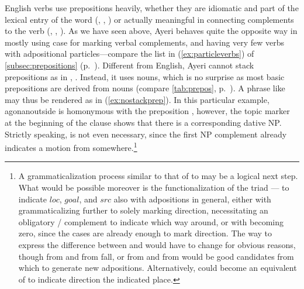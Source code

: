 English verbs use prepositions heavily, whether they are idiomatic and part of
the lexical entry of the word (, , ) or
actually meaningful in connecting complements to the verb (, 
, ). As we have seen above, Ayeri behaves quite the
opposite way in mostly using case for marking verbal complements, and having
very few verbs with adpositional particles---compare the list in
(\ref{ex:particleverbs}) of \autoref{subsec:prepositions}
(p.~\pageref{ex:particleverbs}). Different from English, Ayeri cannot stack
prepositions as in , . Instead, it uses nouns, which is no surprise as most basic
prepositions are derived from nouns (compare \autoref{tab:prepos},
p.~\pageref{tab:prepos}). A phrase like  may thus be
rendered as in (\ref{ex:nostackprep}). In this particular example,
 {agonan}{outside} is homonymous with the preposition
, however, the topic marker at the beginning
of the clause shows that there is a corresponding dative NP. Strictly speaking,
 is not even necessary, since the first NP complement
already indicates a motion from somewhere.\footnote{A grammaticalization
process similar to that of  to
 may be a logical next step. What would be possible
moreover is the functionalization of the triad \Loc{}--\Dat{}--\Gen{} to
indicate $loc$, $goal$, and $src$ also with adpositions in general, either with
 grammaticalizing further to solely marking direction,
necessitating an obligatory \Dat{}/\Gen{} complement to indicate which way
around, or with  becoming zero, since the cases are already
enough to mark direction.
%
%
The way to express the difference between  and 
would have to change for obvious reasons, though  from 
 and  from 
{fall}, or  from  and
 from  would be good candidates
from which to generate new adpositions. Alternatively,  could
become an equivalent of  to indicate direction  the
indicated place.
%
%
}

